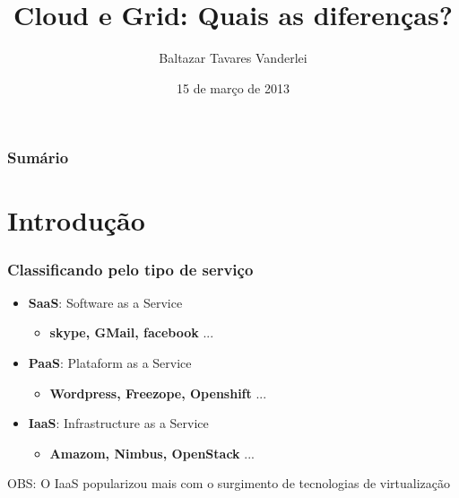 \documentclass[10pt]{beamer}
\title[]{\textbf{Cloud} e \textbf{Grid}: Quais as diferenças?}
\author[]{Baltazar Tavares Vanderlei}
\date{15 de março de 2013}
\institute[2013]{Laboratório de Computação Científica e Visualização - LCCV/UFAL}
\begin{document}
\newcommand{\til}{\~{}}

\frame{\titlepage}
	\begin{frame}[t]
	\frametitle{Sumário}
	\tableofcontents[framebreaks]
\end{frame}



\section{Introdução}
	\begin{frame}%
	\frametitle{Classificando pelo tipo de serviço}
		\begin{itemize}%
			\item \textbf{SaaS}: Software as a Service
			\begin{itemize}
				\item \textbf{skype, GMail, facebook} ...
			\end{itemize}
			\item \textbf{PaaS}: Plataform as a Service
			\begin{itemize}
				\item \textbf{Wordpress, Freezope, Openshift} ...
			\end{itemize}
			\item \textbf{IaaS}: Infrastructure as a Service
			\begin{itemize}
				\item \textbf{Amazom, Nimbus, OpenStack} ...
			\end{itemize}
		\end{itemize}
		\pause
		\begin{block}{OBS:}
			O IaaS popularizou mais com o surgimento de tecnologias de virtualização
		\end{block}
	\end{frame}
\end{document}
